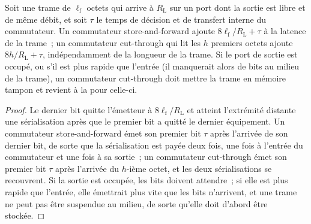 \begin{proposition}\label{prop:nw:switches-and-layer-1-devices:add}
Soit une trame de $\ell_{\mathrm f}$ octets qui arrive à $R_{\mathrm L}$ sur un port dont la sortie est libre et de même débit, et soit
$\tau$ le temps de décision et de transfert interne du commutateur. Un commutateur store-and-forward ajoute
$8\ell_{\mathrm f}/R_{\mathrm L} + \tau$ à la latence de la trame~; un commutateur cut-through qui lit les $h$ premiers octets ajoute
$8h/R_{\mathrm L} + \tau$, indépendamment de la longueur de la trame. Si le port de sortie est occupé, ou s'il est plus rapide que l'entrée (il manquerait alors
de bits au milieu de la trame), un commutateur cut-through doit mettre la trame en mémoire tampon et revient à la  pour
celle-ci.
\end{proposition}

\begin{proof}
Le dernier bit quitte l'émetteur à $8\ell_{\mathrm f}/R_{\mathrm L}$ et atteint l'extrémité distante une sérialisation après que le
premier bit a quitté le dernier équipement. Un commutateur store-and-forward émet son premier bit $\tau$ après l'arrivée de son dernier bit, de sorte que la sérialisation
est payée deux fois, une fois à l'entrée du commutateur et une fois à sa sortie~; un commutateur cut-through émet son premier bit $\tau$ après l'arrivée du $h$-ième octet,
et les deux sérialisations se recouvrent. Si la sortie est occupée, les bits doivent attendre~; si elle est plus rapide que l'entrée, elle émettrait
plus vite que les bits n'arrivent, et une trame ne peut pas être suspendue au milieu, de sorte qu'elle doit d'abord être stockée.
\end{proof}

